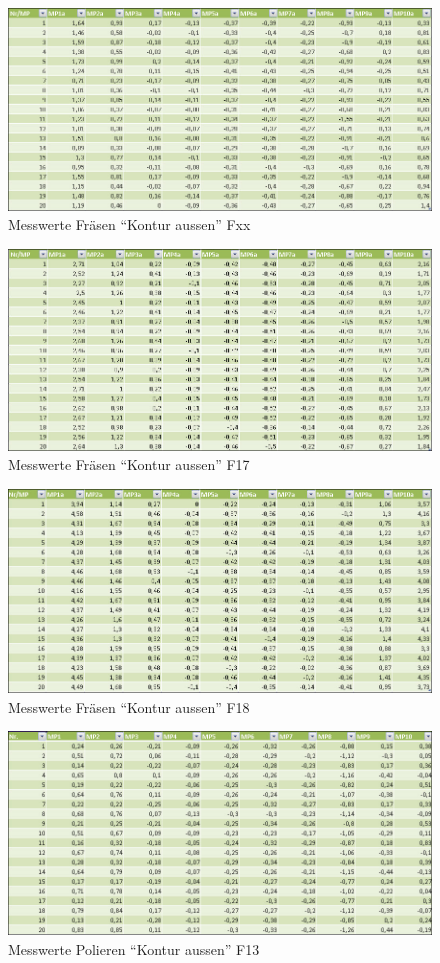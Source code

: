 \documentclass[12pt,a4paper,parskip]{scrartcl}
\begin{document}
\begin{figure}[hbtp]
\centering
\includegraphics[width=1\textwidth]{Fxxfraes.jpg}
\caption{Messwerte Fräsen "`Kontur aussen"' Fxx}
\end{figure}
\begin{figure}[hbtp]
\centering
\includegraphics[width=1\textwidth]{F17fraes.jpg}
\caption{Messwerte Fräsen "`Kontur aussen"' F17}
\end{figure}
\begin{figure}[hbtp]
\centering
\includegraphics[width=1\textwidth]{F18fraes.jpg}
\caption{Messwerte Fräsen "`Kontur aussen"' F18}
\end{figure}
\begin{figure}[hbtp]
\centering
\includegraphics[width=1\textwidth]{F13polier.jpg}
\caption{Messwerte Polieren "`Kontur aussen"' F13}
\end{figure}
\end{document}
